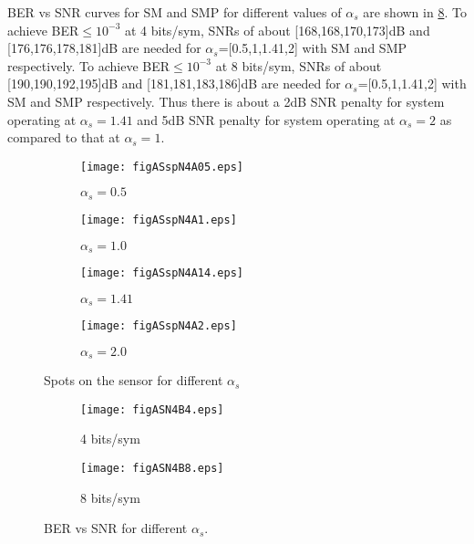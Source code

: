 BER vs SNR curves for SM and SMP for different values of $\alpha_{s}$ are shown in \figurename{ \ref{figASBvS}}. To achieve BER$\leq10^{-3}$ at 4 bits/sym, SNRs of about [168,168,170,173]dB and [176,176,178,181]dB are needed for $\alpha_{s}$=[0.5,1,1.41,2]  with SM and SMP respectively. To achieve BER$\leq10^{-3}$ at 8 bits/sym, SNRs of about [190,190,192,195]dB and [181,181,183,186]dB are needed for $\alpha_{s}$=[0.5,1,1.41,2] with SM and SMP respectively. Thus there is about a 2dB SNR penalty for system operating at $\alpha_{s}=1.41$ and 5dB SNR penalty for system operating at $\alpha_{s}=2$ as compared to that at $\alpha_{s}=1$.

\begin{figure}[!b]
	\centering
		\begin{subfigure}{0.49\textwidth}
			\centering
			\texttt{[image: figASspN4A05.eps]}
			\label{figASspN4A05}
		\caption{$\alpha_{s}=0.5$}
		\end{subfigure}
		\hfill
		\begin{subfigure}{0.49\textwidth}
			\centering
			\texttt{[image: figASspN4A1.eps]}
			\label{figASspN4A1}
		\caption{$\alpha_{s}=1.0$}
		\end{subfigure}
		\vfill
		\begin{subfigure}{0.49\textwidth}
			\centering
			\texttt{[image: figASspN4A14.eps]}
			\label{figASspN4A14}
		\caption{$\alpha_{s}=1.41$}
		\end{subfigure}
		\hfill
		\begin{subfigure}{0.49\textwidth}
			\centering
			\texttt{[image: figASspN4A2.eps]}
			\label{figASspN4A2}
		\caption{$\alpha_{s}=2.0$}
		\end{subfigure}
		
	\caption{Spots on the sensor for different $\alpha_{s}$}
	\label{figASSpots}
\end{figure}

\begin{figure}
	\centering
		\begin{subfigure}{\textwidth}
			\centering
			\texttt{[image: figASN4B4.eps]}
			\caption{4 bits/sym}
			\label{figASN4B4}
		\end{subfigure}
		
		\begin{subfigure}{\textwidth}
			\centering
			\texttt{[image: figASN4B8.eps]}
			\caption{8 bits/sym}
			\label{figASN4B8}
		\end{subfigure}
		
		\caption{BER vs SNR for different $\alpha_{s}$.}
		\label{figASBvS}
\end{figure}

